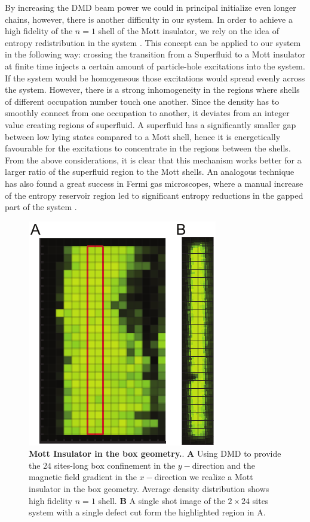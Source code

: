 By increasing the DMD beam power we could in principal initialize even longer chains, however, there is another difficulty in our system. In order to achieve a high fidelity of the $n=1$ shell of the Mott insulator, we rely on the idea of entropy redistribution in the system \cite{some entropy redistribution}. This concept can be applied to our system in the following way: crossing the transition from a Superfluid to a Mott insulator at finite time injects a certain amount of particle-hole excitations into the system. If the system would be homogeneous those excitations would spread evenly across the system. However, there is a strong inhomogeneity in the regions where shells of different occupation number touch one another. Since the density has to smoothly connect from one occupation to another, it deviates from an integer value creating regions of superfluid. A superfluid has a significantly smaller gap between low lying states compared to a Mott shell, hence it is energetically favourable for the excitations to concentrate in the regions between the shells. From the above considerations, it is clear that this mechanism works better for a larger ratio of the superfluid region to the Mott shells. An analogous technique has also found a great success in Fermi gas microscopes, where a manual increase of the entropy reservoir region led to significant entropy reductions in the gapped part of the system \cite{Mazurenko2017, Chiu2018}.

\begin{figure}[t]
	\centering
	\includegraphics[scale=1]{figures/CTE_MI_box.pdf}
	\caption{{\bf Mott Insulator in the box geometry.}. {\bf A} Using DMD to provide the $24$ sites-long box confinement in the $y-\mathrm{direction}$ and the magnetic field gradient in the $x-\mathrm{direction}$ we realize a Mott insulator in the box geometry. Average density distribution shows high fidelity $n=1$ shell.  {\bf B} A single shot image of the $2\times24$ sites system with a single defect cut form the highlighted region in A.}
	\label{fig:CTE_MI_box}
\end{figure}

